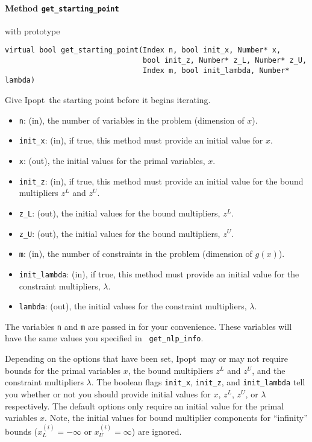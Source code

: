 \documentclass[10pt]{article}
\newcommand{\Ipopt}{{\sc Ipopt}}
\begin{document}
\paragraph{Method {\texttt{get\_starting\_point}}} with prototype
\begin{verbatim}
virtual bool get_starting_point(Index n, bool init_x, Number* x,
                                bool init_z, Number* z_L, Number* z_U,
                                Index m, bool init_lambda, Number* lambda)
\end{verbatim}
Give \Ipopt\ the starting point before it begins iterating.
\begin{itemize}
\item {\tt n}: (in), the number of variables in the problem (dimension of $x$). 
\item {\tt init\_x}: (in), if true, this method must provide an initial value for $x$.
\item {\tt x}: (out), the initial values for the primal variables, $x$.
\item {\tt init\_z}: (in), if true, this method must provide an initial value 
        for the bound multipliers $z^L$ and $z^U$.
\item {\tt z\_L}: (out), the initial values for the bound multipliers, $z^L$.
\item {\tt z\_U}: (out), the initial values for the bound multipliers, $z^U$.
\item {\tt m}: (in), the number of constraints in the problem (dimension of $g(x)$).
\item {\tt init\_lambda}: (in), if true, this method must provide an initial value 
        for the constraint multipliers, $\lambda$.
\item {\tt lambda}: (out), the initial values for the constraint multipliers, $\lambda$.
\end{itemize}

The variables {\tt n} and {\tt m} are passed in for your convenience.
These variables will have the same values you specified in {\tt
  get\_nlp\_info}.

Depending on the options that have been set, \Ipopt\ may or may not
require bounds for the primal variables $x$, the bound multipliers
$z^L$ and $z^U$, and the constraint multipliers $\lambda$. The boolean
flags {\tt init\_x}, {\tt init\_z}, and {\tt init\_lambda} tell you
whether or not you should provide initial values for $x$, $z^L$, $z^U$, or
$\lambda$ respectively. The default options only require an initial
value for the primal variables $x$.  Note, the initial values for
bound multiplier components for ``infinity'' bounds
($x_L^{(i)}=-\infty$ or $x_U^{(i)}=\infty$) are ignored.
\end{document}
